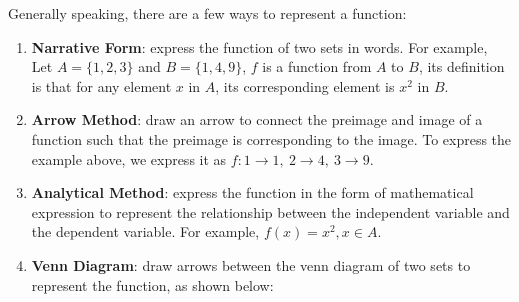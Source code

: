 \documentclass[12pt]{report}
\begin{document}
Generally speaking, there are a few ways to represent a function:
\begin{enumerate}
      \item \textbf{Narrative Form}: express the function of two sets in words. For example, Let $A = \big\{1, 2, 3\big\}$ and $B = \big\{1, 4, 9\big\}$, $f$ is a function from $A$ to $B$, its definition is that for any element $x$ in $A$, its corresponding element is $x^2$ in $B$.
      \item \textbf{Arrow Method}: draw an arrow to connect the preimage and image of a function such that the preimage is corresponding to the image. To express the example above, we express it as $f: 1 \to 1,\ 2 \to 4,\ 3 \to 9$.
      \item \textbf{Analytical Method}: express the function in the form of mathematical expression to represent the relationship between the independent variable and the dependent variable. For example, $f (x) = x^2, x \in A$.
      \item \textbf{Venn Diagram}: draw arrows between the venn diagram of two sets to represent the function, as shown below:
            \begin{center}
\end{center}
\end{enumerate}
\end{document}
